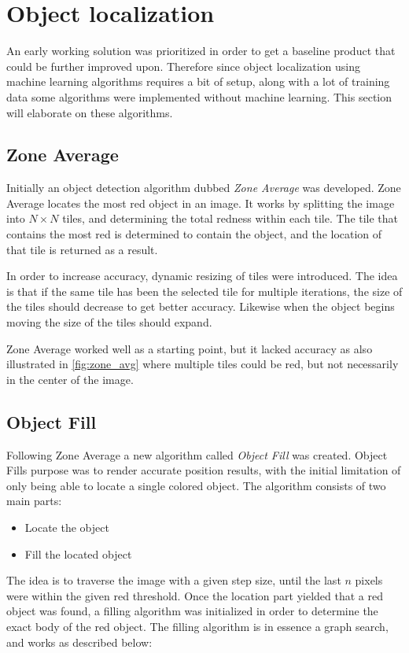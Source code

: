 \section{Object localization}\label{Design:ObjectLocalization}
An early working solution was prioritized in order to get a baseline product that could be further improved upon.
Therefore since object localization using machine learning algorithms requires a bit of setup, along with a lot of training data some algorithms were implemented without machine learning.
This section will elaborate on these algorithms.

\subsection{Zone Average}
Initially an object detection algorithm dubbed \textit{Zone Average} was developed.
Zone Average locates the most red object in an image.
It works by splitting the image into $N\times N$ tiles, and determining the total redness within each tile.
The tile that contains the most red is determined to contain the object, and the location of that tile is returned as a result.

In order to increase accuracy, dynamic resizing of tiles were introduced.
The idea is that if the same tile has been the selected tile for multiple iterations, the size of the tiles should decrease to get better accuracy.
Likewise when the object begins moving the size of the tiles should expand.


Zone Average worked well as a starting point, but it lacked accuracy as also illustrated in \autoref{fig:zone_avg} where multiple tiles could be red, but not necessarily in the center of the image.

\subsection{Object Fill}
\label{sec:objectfilldesign}
Following Zone Average a new algorithm called \textit{Object Fill} was created.
Object Fills purpose was to render accurate position results, with the initial limitation of only being able to locate a single colored object.
The algorithm consists of two main parts:
\begin{itemize}
	\item Locate the object
	\item Fill the located object
\end{itemize}
The idea is to traverse the image with a given step size, until the last $n$ pixels were within the given red threshold.
Once the location part yielded that a red object was found, a filling algorithm was initialized in order to determine the exact body of the red object.
The filling algorithm is in essence a graph search, and works as described below:

